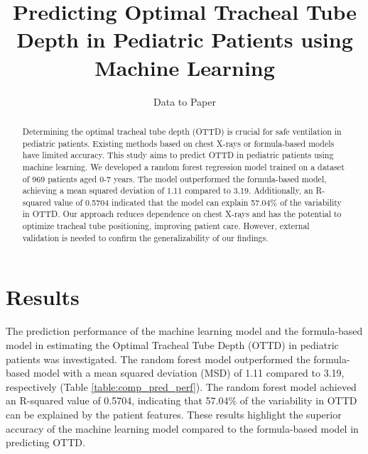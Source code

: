 \documentclass[11pt]{article}
\title{Predicting Optimal Tracheal Tube Depth in Pediatric Patients using Machine Learning}
\author{Data to Paper}
\begin{document}
\maketitle
\begin{abstract}
Determining the optimal tracheal tube depth (OTTD) is crucial for safe ventilation in pediatric patients. Existing methods based on chest X-rays or formula-based models have limited accuracy. This study aims to predict OTTD in pediatric patients using machine learning. We developed a random forest regression model trained on a dataset of 969 patients aged 0-7 years. The model outperformed the formula-based model, achieving a mean squared deviation of 1.11 compared to 3.19. Additionally, an R-squared value of 0.5704 indicated that the model can explain 57.04\% of the variability in OTTD. Our approach reduces dependence on chest X-rays and has the potential to optimize tracheal tube positioning, improving patient care. However, external validation is needed to confirm the generalizability of our findings.
\end{abstract}
\section*{Results}

The prediction performance of the machine learning model and the formula-based model in estimating the Optimal Tracheal Tube Depth (OTTD) in pediatric patients was investigated. The random forest model outperformed the formula-based model with a mean squared deviation (MSD) of 1.11 compared to 3.19, respectively (Table {}\ref{table:comp_pred_perf}). The random forest model achieved an R-squared value of 0.5704, indicating that 57.04\% of the variability in OTTD can be explained by the patient features. These results highlight the superior accuracy of the machine learning model compared to the formula-based model in predicting OTTD.
\end{document}
